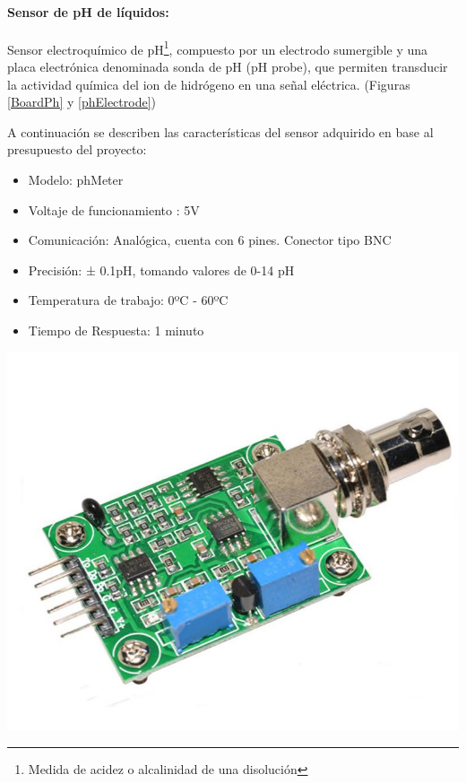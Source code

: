             \paragraph{Sensor de pH de líquidos:}Sensor electroquímico de pH\footnote{ Medida de acidez o alcalinidad de una disolución}, compuesto por un electrodo sumergible y una placa electrónica denominada sonda de pH (pH probe), que permiten transducir la actividad química del ion de hidrógeno en una señal eléctrica. (Figuras \ref{BoardPh} y \ref{phElectrode})
                
                \par A continuación se describen las características del sensor adquirido en base al presupuesto del proyecto:
                
                \begin{itemize}
                    \item Modelo: phMeter
                    \item Voltaje de funcionamiento : 5V
                    \item Comunicación: Analógica, cuenta con 6 pines. Conector tipo BNC
                    \item Precisión: ± 0.1pH, tomando valores de 0-14 pH
                    \item Temperatura de trabajo: 0ºC - 60ºC
                    \item Tiempo de Respuesta: 1 minuto
                \end{itemize}
                
                \begin{minipage}{0.95\textwidth}
                    \begin{center}
                    \includegraphics[scale=0.25]{hardware/phmoduloplaca.jpg}
                    \label{BoardPh}
                    \end{center}
                \end{minipage}
                
